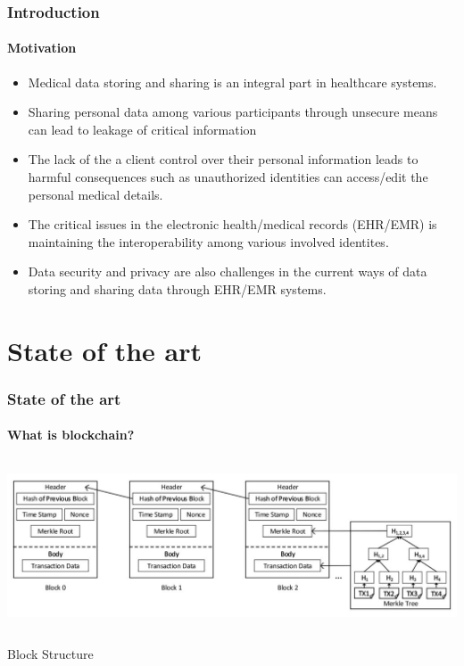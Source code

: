 \documentclass[english,hangout]{beamer}
\begin{document}
\begin{frame}[fragile]
 \frametitle{Introduction}
 \framesubtitle{Motivation}
    \begin{itemize}
        \item Medical data storing and sharing is an integral part in healthcare systems.
        \item Sharing personal data among various participants through unsecure means can lead to leakage of critical information
        \item  The lack of the a client control over their personal information leads to harmful consequences such as unauthorized identities can access/edit the personal medical details.
        \item  The critical issues in the electronic health/medical records (EHR/EMR) is maintaining the interoperability among various involved identites.
        \item Data security and privacy are also challenges in the current ways of data storing and sharing data through EHR/EMR systems.
    \end{itemize}
\end{frame}

\section{State of the art}


\begin{frame}[fragile]
 \frametitle{State of the art}
 \framesubtitle{What is blockchain?}
    \begin{center}
        \vspace{-1.2em}
            \includegraphics[width=10cm\textwidth,height=5cm]{Block structure.JPG}
            
             \caption{Block Structure \cite{b8}}
        \end{center}
        \vspace{-3mm}
\end{frame}
\end{document}
